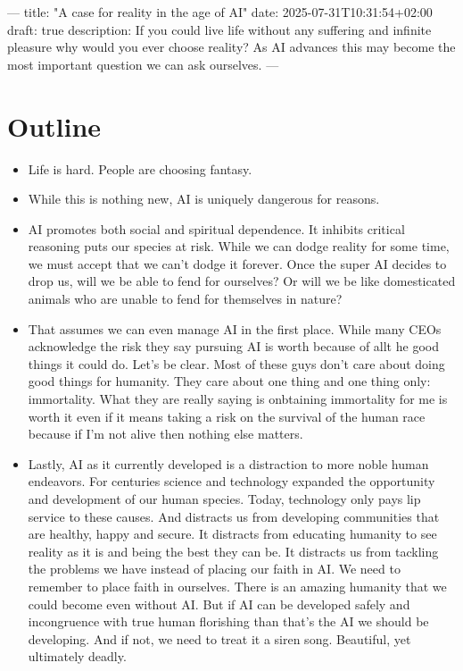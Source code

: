 \documentclass[11pt]{article}
\author{Robert Vesco}
\date{\today}
\title{}
\begin{document}
\tableofcontents

---
title: "A case for reality in the age of AI"
date: 2025-07-31T10:31:54+02:00
draft: true
description: If you could live life without any suffering and infinite pleasure why would you ever choose reality? As AI advances this may become the most important question we can ask ourselves. 
---
\section{Outline}
\label{sec:org3cd69c8}

\begin{itemize}
\item Life is hard. People are choosing fantasy.
\item While this is nothing new, AI is uniquely dangerous for reasons.
\item AI promotes both social and spiritual dependence. It inhibits critical reasoning puts our species at risk. While we can dodge reality for some time, we must accept that we can't dodge it forever. Once the super AI decides to drop us, will we be able to fend for ourselves? Or will we be like domesticated animals who are unable to fend for themselves in nature?
\item That assumes we can even manage AI in the first place. While many CEOs acknowledge the risk they say pursuing AI is worth because of allt he good things it could do. Let's be clear. Most of these guys don't care about doing good things for humanity. They care about one thing and one thing only: immortality. What they are really saying is onbtaining immortality for me is worth it even if it means taking a risk on the survival of the human race because if I'm not alive then nothing else matters.
\item Lastly, AI as it currently developed is a distraction to more noble human endeavors. For centuries science and technology expanded the opportunity and development of our human species. Today, technology only pays lip service to these causes. And distracts us from developing communities that are healthy, happy and secure. It distracts from educating humanity to see reality as it is and being the best they can be. It distracts us from tackling the problems we have instead of placing our faith in AI. We need to remember to place faith in ourselves. There is an amazing humanity that we could become even without AI. But if AI can be developed safely and incongruence with true human florishing than that's the AI we should be developing. And if not, we need to treat it a siren song. Beautiful, yet ultimately deadly.
\end{itemize}
\end{document}
